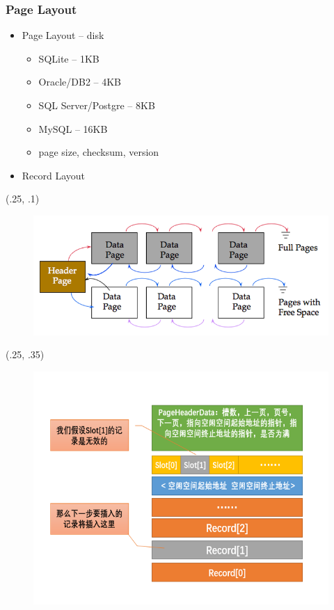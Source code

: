 \begin{frame}[fragile]
	\frametitle{Page Layout}
	\begin{itemize}
		\item Page Layout – disk
		\begin{itemize}
			\item SQLite – 1KB
			\item Oracle/DB2 – 4KB
			\item SQL Server/Postgre – 8KB
			\item MySQL – 16KB
			\item page size, checksum, version
		\end{itemize}
		\item Record Layout
	\end{itemize}
	\begin{textblock*}{.9\paperwidth}(.25\paperwidth, .1\paperheight) %
		\begin{figure}
			\includegraphics[width=.4\linewidth]{figs/dbfile-heapfile1.png}
		\end{figure}
	\end{textblock*}
	\begin{textblock*}{.9\paperwidth}(.25\paperwidth, .35\paperheight) %
		\begin{figure}
			\includegraphics[width=.4\linewidth]{figs/dbfile-records.png}
		\end{figure}
	\end{textblock*}
\end{frame}


